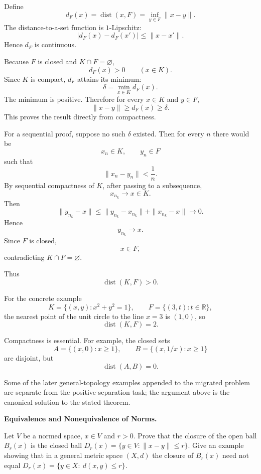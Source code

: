 \begin{solution}
Define
\[
d_F(x)=\operatorname{dist}(x,F)
=
\inf_{y\in F}\|x-y\|.
\]
The distance-to-a-set function is \(1\)-Lipschitz:
\[
|d_F(x)-d_F(x')|
\le
\|x-x'\|.
\]
Hence \(d_F\) is continuous.

Because \(F\) is closed and \(K\cap F=\varnothing\),
\[
d_F(x)>0
\qquad(x\in K).
\]
Since \(K\) is compact, \(d_F\) attains its minimum:
\[
\delta
=
\min_{x\in K}d_F(x).
\]
The minimum is positive. Therefore for every \(x\in K\) and \(y\in F\),
\[
\|x-y\|
\ge
d_F(x)
\ge
\delta.
\]
This proves the result directly from compactness.

For a sequential proof, suppose no such \(\delta\) existed. Then for every \(n\) there would be
\[
x_n\in K,\qquad y_n\in F
\]
such that
\[
\|x_n-y_n\|<\frac1n.
\]
By sequential compactness of \(K\), after passing to a subsequence,
\[
x_{n_k}\to x\in K.
\]
Then
\[
\|y_{n_k}-x\|
\le
\|y_{n_k}-x_{n_k}\|
+
\|x_{n_k}-x\|
\longrightarrow0.
\]
Hence
\[
y_{n_k}\to x.
\]
Since \(F\) is closed,
\[
x\in F,
\]
contradicting \(K\cap F=\varnothing\).

Thus
\[
\boxed{\operatorname{dist}(K,F)>0.}
\]

For the concrete example
\[
K=\{(x,y):x^2+y^2=1\},
\qquad
F=\{(3,t):t\in\mathbb R\},
\]
the nearest point of the unit circle to the line \(x=3\) is \((1,0)\), so
\[
\operatorname{dist}(K,F)=2.
\]

Compactness is essential. For example, the closed sets
\[
A=\{(x,0):x\ge1\},
\qquad
B=\{(x,1/x):x\ge1\}
\]
are disjoint, but
\[
\operatorname{dist}(A,B)=0.
\]

Some of the later general-topology examples appended to the migrated problem are separate from the positive-separation task; the argument above is the canonical solution to the stated theorem.
\end{solution}


\begin{problem}[CP-II-0162]
\label{prob:cp-ii-0162}
\textbf{Equivalence and Nonequivalence of Norms.}

\hspace*{1.5em}Let $V$ be a normed space, $x\in V$ and $r>0$. Prove that the closure of the open ball
$B_r(x)$ is the closed ball $D_r(x)=\{y\in V:\|x-y\|\le r\}$.
Give an example showing that in a general metric space $(X,d)$ the closure of $B_r(x)$
need not equal $D_r(x)=\{y\in X:\ d(x,y)\le r\}$.
\end{problem}

